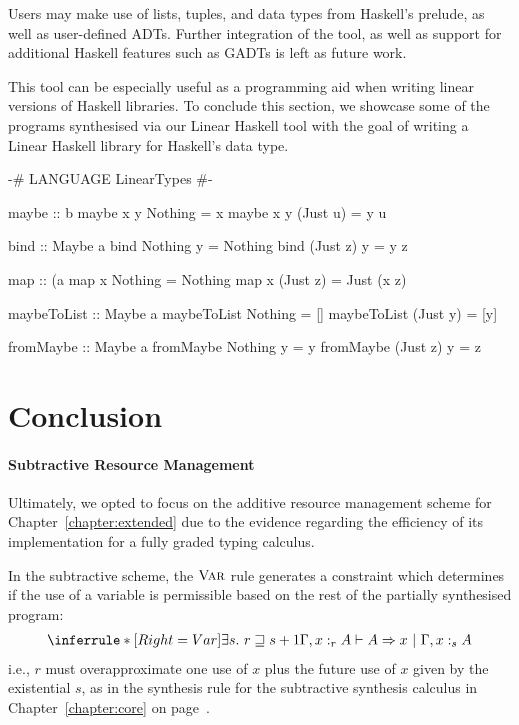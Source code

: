 Users may make use of lists, tuples,  and  data
types from Haskell's prelude, as well as user-defined ADTs. Further integration
of the tool, as well as support for additional Haskell features such as GADTs is
left as future work.

This tool can be especially useful as a programming aid when writing linear
versions of Haskell libraries. To conclude this section, we showcase some of the
programs synthesised via our Linear Haskell tool with the goal of writing a
Linear Haskell library for Haskell's  data type. 

\vspace{1em}
\begin{haskell}
{-# LANGUAGE LinearTypes #-}

maybe :: b %
maybe x y Nothing = x
maybe x y (Just u) = y u

bind :: Maybe a %
bind Nothing y = Nothing
bind (Just z) y = y z

map :: (a %
map x Nothing = Nothing
map x (Just z) = Just (x z)

maybeToList :: Maybe a %
maybeToList Nothing = []
maybeToList (Just y) = [y]

fromMaybe :: Maybe a %
fromMaybe Nothing y = y
fromMaybe (Just z) y = z

\end{haskell}


\section{Conclusion}
\label{section:graded-base-conclusion}

\paragraph{Subtractive Resource Management}
Ultimately, we opted to focus on the additive resource management scheme for
Chapter~\ref{chapter:extended} due to the evidence regarding the efficiency of
its implementation for a fully graded typing calculus.

In the subtractive scheme, the $\textsc{Var}$ rule generates a constraint which
determines if the use of a variable is permissible based on the rest of the
partially synthesised program:
\begin{align*}
  \inferrule*[Right=Var]
  {\exists s .\ r \sqsupseteq s + 1}
  {\Gamma, x :_{r} A \vdash A \Rightarrow x\ |\ \Gamma, x :_{s} A}
\end{align*}
i.e., $r$ must overapproximate one use of $x$ plus the future use of
$x$ given by the existential $s$, as in the synthesis rule for the subtractive
synthesis calculus in Chapter~\ref{chapter:core} on page~\pageref{sub:grVar}.

